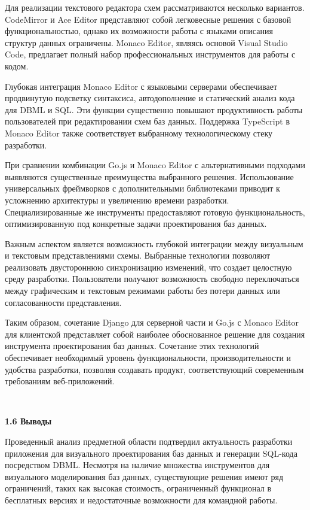 Для реализации текстового редактора схем рассматриваются несколько вариантов. CodeMirror и Ace Editor представляют собой легковесные решения с базовой функциональностью, однако их возможности работы с языками описания структур данных ограничены. Monaco Editor, являясь основой Visual Studio Code, предлагает полный набор профессиональных инструментов для работы с кодом.

Глубокая интеграция Monaco Editor с языковыми серверами обеспечивает продвинутую подсветку синтаксиса, автодополнение и статический анализ кода для DBML и SQL. Эти функции существенно повышают продуктивность работы пользователей при редактировании схем баз данных. Поддержка TypeScript в Monaco Editor также соответствует выбранному технологическому стеку разработки.

При сравнении комбинации Go.js и Monaco Editor с альтернативными подходами выявляются существенные преимущества выбранного решения. Использование универсальных фреймворков с дополнительными библиотеками приводит к усложнению архитектуры и увеличению времени разработки. Специализированные же инструменты предоставляют готовую функциональность, оптимизированную под конкретные задачи проектирования баз данных.

Важным аспектом является возможность глубокой интеграции между визуальным и текстовым представлениями схемы. Выбранные технологии позволяют реализовать двустороннюю синхронизацию изменений, что создает целостную среду разработки. Пользователи получают возможность свободно переключаться между графическим и текстовым режимами работы без потери данных или согласованности представления.

Таким образом, сочетание Django для серверной части и Go.js с Monaco Editor для клиентской представляет собой наиболее обоснованное решение для создания инструмента проектирования баз данных. Сочетание этих технологий обеспечивает необходимый уровень функциональности, производительности и удобства разработки, позволяя создавать продукт, соответствующий современным требованиям веб-приложений.

\

\textbf{\large 1.6 Выводы}

Проведенный анализ предметной области подтвердил актуальность разработки приложения для визуального проектирования баз данных и генерации SQL-кода посредством DBML. Несмотря на наличие множества инструментов для визуального моделирования баз данных, существующие решения имеют ряд ограничений, таких как высокая стоимость, ограниченный функционал в бесплатных версиях и недостаточные возможности для командной работы.

